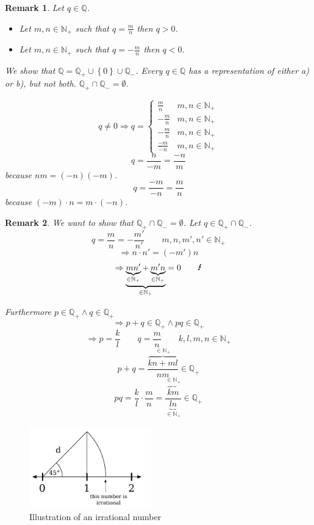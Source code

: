 \documentclass[a4paper,landscape,twocolumn]{article}
\newtheorem{rem}{Remark}
\newcommand\set[1]{\left\{#1\right\}}
\begin{document}
\begin{rem}
  Let $q \in \mathbb{Q}$.
  \begin{itemize}
    \item[a)] Let $m,n \in \mathbb{N}_+$ such that $q = \frac mn$ then $q > 0$.
    \item[b)] Let $m,n \in \mathbb{N}_+$ such that $q = -\frac mn$ then $q < 0$.
  \end{itemize}

  We show that $\mathbb{Q} = \mathbb{Q}_+ \cup \set{0} \cup \mathbb{Q}_-$.
  Every $q \in \mathbb{Q}$ has a representation of either a) or b), but not both.
  $\mathbb{Q}_+ \cap \mathbb{Q}_- = \emptyset$.

  \[
    q \neq 0 \Rightarrow q = \begin{cases}
      \frac mn & m,n \in \mathbb{N}_+ \\
      -\frac mn & m,n \in \mathbb{N}_+ \\
      -\frac mn & m,n \in \mathbb{N}_+ \\
      \frac{-m}{-n} & m,n \in \mathbb{N}_+
    \end{cases}
  \]
  \[ q = \frac{n}{-m} = \frac{-n}{m} \]
  because $nm = (-n)(-m)$.
  \[ q = \frac{-m}{-n} = \frac mn \]
  because $(-m) \cdot n = m \cdot (-n)$.
\end{rem}

\begin{rem}
  We want to show that $\mathbb{Q}_+ \cap \mathbb{Q}_- = \emptyset$.
  Let $q \in \mathbb{Q}_+ \cap \mathbb{Q}_-$.
  \[ q = \frac mn = -\frac{m'}{n'} \qquad m,n,m',n' \in \mathbb{N}_+ \]
  \[ \Rightarrow n \cdot n' = (-m') n \]
  \[ \Rightarrow \underbrace{\underbrace{mn'}_{\in \mathbb{N}_+} + \underbrace{m' n}_{\in \mathbb{N}_+}}_{\in \mathbb{N}_+} = 0 \qquad\text{\Lightning} \]

  Furthermore $p \in \mathbb{Q}_+ \land q \in \mathbb{Q}_+$
  \[ \Rightarrow p + q \in \mathbb{Q}_+ \land pq \in \mathbb{Q}_+ \]
  \[ \Rightarrow p = \frac kl \qquad q = \frac mn \qquad k,l,m,n \in \mathbb{N}_+ \]
  \[ p + q = \frac{\overbrace{kn + ml}^{\in \mathbb{N}_+}}{nm} \in \mathbb{Q}_+ \]
  \[ pq = \frac{k}{l} \cdot \frac mn = \frac{\overbrace{km}^{\in \mathbb{N}_+}}{\underbrace{ln}_{\in \mathbb{N}_+}} \in \mathbb{Q}_+ \]
\end{rem}

\begin{figure}[!h]
  \begin{center}
    \includegraphics[width=200px]{img/irrational_number.pdf}
    \caption{Illustration of an irrational number}
  \end{center}
\end{figure}
\end{document}
